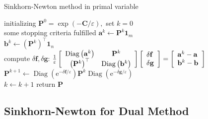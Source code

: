 \documentclass{article}
\begin{document}
\begin{algorithm}[H]
  \SetAlgoNoLine
  \caption{Sinkhorn-Newton method in primal variable} 
   initializing $\mathbf{P} ^ { 0 } = \exp ( - \mathbf{C} / \varepsilon ) ,$ set $k = 0$\\
  \Repeat
  { some stopping criteria fulfilled }{
 $\mathbf{a} ^ { k } \gets \mathbf{P} ^ { k } \mathbf{1}_ { m }$\\  
 $\mathbf{b} ^ { k } \gets \left( \mathbf{P} ^ { k } \right) ^ { \top } \mathbf { 1 } _ { n }$\\
  compute $\delta \mathbf{f}, \delta \mathbf{g}$: 
  \quad$\frac { 1 } { \varepsilon } \left[ \begin{array} { c c } { \operatorname { Diag } \left( \mathbf{a} ^ { k } \right) } & { \mathbf{P} ^ { k } } \\ { \left( \mathbf{P} ^ { k } \right) ^ { \top } } & { \operatorname { Diag } \left( \mathbf{b} ^ { k } \right) } \end{array} \right] \left[ \begin{array} { l } { \delta \mathbf{f} } \\ { \delta \mathbf{g} } \end{array} \right] = \left[ \begin{array} { l } { \mathbf{a} ^ { k } - \mathbf{a} } \\ { \mathbf{b} ^ { k } - \mathbf{b} } \end{array} \right]$\\
$\mathbf{P} ^ { k + 1 } \gets \operatorname { Diag } \left( \mathrm { e } ^ { - \delta \mathbf{f} / \varepsilon } \right) \mathbf{P} ^ { k } \operatorname { Diag } \left( \mathrm { e } ^ { - \delta \mathbf{g} / \varepsilon } \right)$\\
   $k\gets k+1$
  }
  return $\mathbf{P}$
\end{algorithm}

\subsection{Sinkhorn-Newton for Dual Method}
\end{document}
